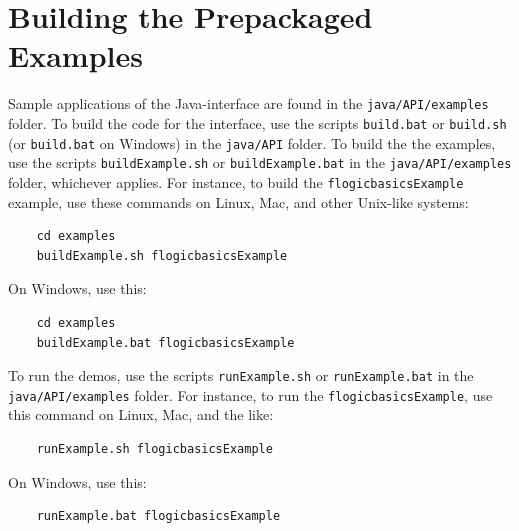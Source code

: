 \section{Building the Prepackaged Examples}

Sample applications of the Java-\FLSYSTEM interface
are found in the {\tt java/API/examples}  folder.
To build the code for the interface, use the scripts {\tt build.bat} or
{\tt build.sh} (or \texttt{build.bat} on Windows)
in the {\tt java/API}  folder.
To build the the examples, use the scripts
{\tt buildExample.sh} or  {\tt buildExample.bat} in the {\tt java/API/examples}
folder, whichever applies. For instance, to
build the {\tt flogicbasicsExample} example, use these commands on Linux,
Mac, and other Unix-like systems:
\begin{verbatim}
    cd examples
    buildExample.sh flogicbasicsExample
\end{verbatim}
On Windows, use this:
\begin{verbatim}
    cd examples
    buildExample.bat flogicbasicsExample
\end{verbatim}

To run the demos, use the scripts
{\tt runExample.sh} or  {\tt runExample.bat}  in the {\tt java/API/examples}
folder. For instance, to
run the {\tt flogicbasicsExample},  use this command on Linux, Mac, and the
like:
\begin{verbatim}
    runExample.sh flogicbasicsExample
\end{verbatim}
On Windows, use this:
\begin{verbatim}
    runExample.bat flogicbasicsExample
\end{verbatim}



